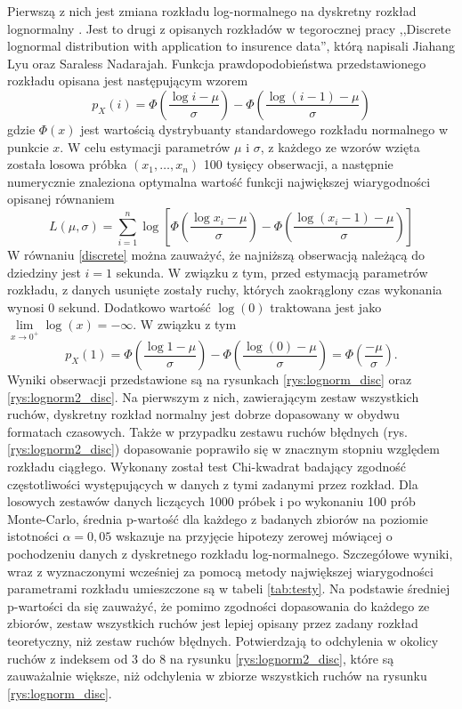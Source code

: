 \documentclass[inzynierska]{pwr_wmat_praca_dyplomowa}
\theoremstyle{plain}
\numberwithin{theorem}{chapter}
\theoremstyle{definition}
\numberwithin{theorem}{chapter}
\begin{document}
Pierwszą z nich jest zmiana rozkładu log-normalnego na dyskretny rozkład lognormalny \cite{lognorm_disc}. Jest to drugi z opisanych rozkładów w tegorocznej pracy ,,Discrete lognormal distribution with application to insurence data'', którą napisali Jiahang Lyu oraz Saraless Nadarajah. Funkcja prawdopodobieństwa przedstawionego rozkładu opisana jest następującym wzorem
\begin{equation}\label{discrete}
	p_{X}(i)= \Phi\left(\frac{\log i - \mu}{\sigma} \right) - \Phi\left(\frac{\log \left(i - 1\right) - \mu}{\sigma} \right)
\end{equation}
gdzie $\Phi(x)$ jest wartością dystrybuanty standardowego rozkładu normalnego w punkcie $x$.
W celu estymacji parametrów $\mu$ i $\sigma$, z każdego ze wzorów wzięta została losowa próbka $(x_1, \dots, x_n)$ 100 tysięcy obserwacji, a następnie numerycznie znaleziona optymalna wartość funkcji największej wiarygodności opisanej równaniem
\begin{equation}
	L(\mu,\sigma) = \sum_{i=1}^{n} \log\left[ \Phi\left(\frac{\log x_i - \mu}{\sigma} \right) - \Phi\left(\frac{\log \left(x_i - 1\right) - \mu}{\sigma} \right)\right]
\end{equation}
W równaniu \ref{discrete} można zauważyć, że najniższą obserwacją należącą do dziedziny jest $i = 1$ sekunda. W związku z tym, przed estymacją parametrów rozkładu, z danych usunięte zostały ruchy, których zaokrąglony czas wykonania wynosi 0 sekund. Dodatkowo wartość $\log(0)$ traktowana jest jako $\lim\limits_{x \rightarrow 0^{+}}\log(x) = -\infty$. W związku z tym
\begin{equation*}
	p_{X}(1) = \Phi\left(\frac{\log 1 - \mu}{\sigma} \right) - \Phi\left(\frac{\log \left(0\right) - \mu}{\sigma} \right) = \Phi\left(\frac{- \mu}{\sigma} \right).
\end{equation*}
 Wyniki obserwacji przedstawione są na rysunkach \ref{rys:lognorm_disc} oraz \ref{rys:lognorm2_disc}. Na pierwszym z nich, zawierającym zestaw wszystkich ruchów, dyskretny rozkład normalny jest dobrze dopasowany w obydwu formatach czasowych. Także w przypadku zestawu ruchów błędnych (rys. \ref{rys:lognorm2_disc}) dopasowanie poprawiło się w znacznym stopniu względem rozkładu ciągłego. Wykonany został test Chi-kwadrat badający zgodność częstotliwości występujących w danych z tymi zadanymi przez rozkład. Dla losowych zestawów danych liczących 1000 próbek i po wykonaniu 100 prób Monte-Carlo, średnia p-wartość dla każdego z badanych zbiorów na poziomie istotności $\alpha = 0,05$ wskazuje na przyjęcie hipotezy zerowej mówiącej o pochodzeniu danych z dyskretnego rozkładu log-normalnego. Szczegółowe wyniki, wraz z wyznaczonymi wcześniej za pomocą metody największej wiarygodności parametrami rozkładu umieszczone są w tabeli \ref{tab:testy}. Na podstawie średniej p-wartości da się zauważyć, że pomimo zgodności dopasowania do każdego ze zbiorów, zestaw wszystkich ruchów jest lepiej opisany przez zadany rozkład teoretyczny, niż zestaw ruchów błędnych. Potwierdzają to odchylenia w okolicy ruchów z indeksem od 3 do 8 na rysunku \ref{rys:lognorm2_disc}, które są zauważalnie większe, niż odchylenia w zbiorze wszystkich ruchów na rysunku \ref{rys:lognorm_disc}.
\end{document}
